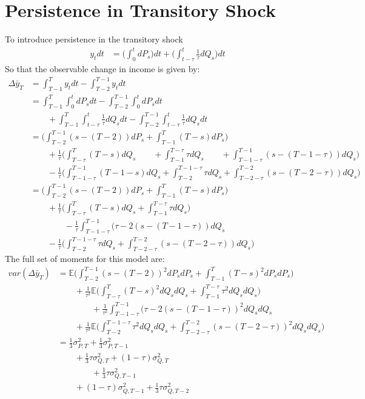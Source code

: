\section{Persistence in Transitory Shock}
To introduce persistence in the transitory shock
 \begin{align*}
 y_t dt &= \Big(\int_{0}^{t} dP_s \Big) dt +\Big(\int_{t-\tau}^{t} \frac{1}{\tau} dQ_s \Big)dt
 \end{align*}
So that the observable change in income is given by:
\begin{align}
\Delta \bar{y}_T &= \int_{T-1}^{T} y_t dt - \int_{T-2}^{T-1} y_t dt \nonumber \\ 
&= \int_{T-1}^{T} \int_{0}^{t}dP_s dt -\int_{T-2}^{T-1} \int_{0}^{t}dP_s dt \nonumber \\
& \qquad +  \int_{T-1}^{T} \int_{t-\tau}^{t} \frac{1}{\tau} dQ_s dt -\int_{T-2}^{T-1}\int_{t-\tau}^{t} \frac{1}{\tau} dQ_s dt \nonumber \\
&= \Big(\int_{T-2}^{T-1} (s-(T-2))dP_s  + \int_{T-1}^{T} (T-s)dP_s \Big) \nonumber \\
& \qquad +\frac{1}{\tau} \Big(\int_{T-\tau}^{T} (T-s)dQ_s \qquad +\int_{T-1}^{T-\tau} \tau dQ_s \qquad +\int_{T-1-\tau}^{T-1} (s-(T-1-\tau)) dQ_s \Big) \\
& \qquad -\frac{1}{\tau} \Big(\int_{T-1-\tau}^{T-1} (T-1-s)dQ_s +\int_{T-2}^{T-1-\tau} \tau dQ_s +\int_{T-2-\tau}^{T-2} (s-(T-2-\tau)) dQ_s \Big) \nonumber \\
&= \Big(\int_{T-2}^{T-1} (s-(T-2))dP_s  + \int_{T-1}^{T} (T-s)dP_s \Big) \nonumber \\
& \qquad +\frac{1}{\tau} \Big(\int_{T-\tau}^{T} (T-s)dQ_s +\int_{T-1}^{T-\tau} \tau dQ_s\Big) \nonumber\\
& \qquad \qquad -\frac{1}{\tau}\int_{T-1-\tau}^{T-1} (\tau - 2(s-(T-1-\tau)) dQ_s  \nonumber\\
& \qquad -\frac{1}{\tau} \Big(\int_{T-2}^{T-1-\tau} \tau dQ_s +\int_{T-2-\tau}^{T-2} (s-(T-2-\tau)) dQ_s \Big)
\end{align}
The full set of moments for this model are:
\begin{align}
var(\Delta \bar{y}_T) &= \mathbb{E} \Big(\int_{T-2}^{T-1} (s-(T-2))^2 dP_s dP_s  + \int_{T-1}^{T} (T-s)^2 dP_s dP_s \Big) \nonumber \\
& \qquad +\frac{1}{\tau^2} \mathbb{E}\Big(\int_{T-\tau}^{T} (T-s)^2dQ_sdQ_s +\int_{T-1}^{T-\tau} \tau^2 dQ_sdQ_s \Big) \nonumber \\
& \qquad \qquad +\frac{1}{\tau^2}\int_{T-1-\tau}^{T-1} (\tau - 2(s-(T-1-\tau))^2 dQ_s dQ_s  \nonumber\\
& \qquad +\frac{1}{\tau^2} \mathbb{E} \Big(\int_{T-2}^{T-1-\tau} \tau^2 dQ_sdQ_s +\int_{T-2-\tau}^{T-2} (s-(T-2-\tau))^2 dQ_sdQ_s \Big) \nonumber \\
&= \frac{1}{3} \sigma^2_{P,T} + \frac{1}{3} \sigma^2_{P,T-1} \nonumber \\
& \qquad +\frac{1}{3}\tau \sigma^2_{Q,T} + (1-\tau) \sigma^2_{Q,T} \nonumber \\
& \qquad \qquad +\frac{1}{3}\tau \sigma^2_{Q,T-1} \nonumber \\
& \qquad +(1-\tau) \sigma^2_{Q,T-1} + \frac{1}{3}\tau \sigma^2_{Q,T-2}
\end{align}
